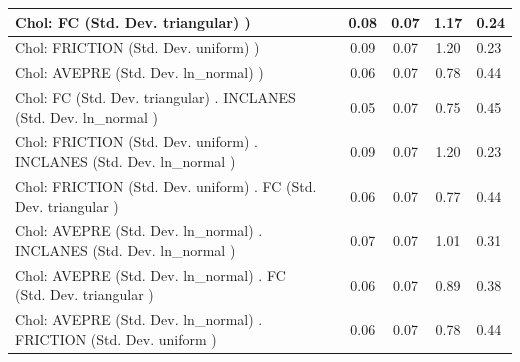 \begin{table}
\begin{center}
\begin{tabular}{|l|l|c|c|c|l|}
			 Chol: FC (Std. Dev. triangular) ) &  & 0.08 & 0.07 & 1.17 & 0.24 \\
			\hline
			 Chol: FRICTION (Std. Dev. uniform) ) &  & 0.09 & 0.07 & 1.20 & 0.23 \\
			\hline
			 Chol: AVEPRE (Std. Dev. ln_normal) ) &  & 0.06 & 0.07 & 0.78 & 0.44 \\
			\hline
			 Chol: FC (Std. Dev. triangular) . INCLANES (Std. Dev.   ln_normal ) &  & 0.05 & 0.07 & 0.75 & 0.45 \\
			\hline
			 Chol: FRICTION (Std. Dev. uniform) . INCLANES (Std. Dev.   ln_normal ) &  & 0.09 & 0.07 & 1.20 & 0.23 \\
			\hline
			 Chol: FRICTION (Std. Dev. uniform) . FC (Std. Dev.   triangular ) &  & 0.06 & 0.07 & 0.77 & 0.44 \\
			\hline
			 Chol: AVEPRE (Std. Dev. ln_normal) . INCLANES (Std. Dev.   ln_normal ) &  & 0.07 & 0.07 & 1.01 & 0.31 \\
			\hline
			 Chol: AVEPRE (Std. Dev. ln_normal) . FC (Std. Dev.   triangular ) &  & 0.06 & 0.07 & 0.89 & 0.38 \\
			\hline
			 Chol: AVEPRE (Std. Dev. ln_normal) . FRICTION (Std. Dev.   uniform ) &  & 0.06 & 0.07 & 0.78 & 0.44 \\
			\hline
		\end{tabular}
	\end{center}
\end{table}